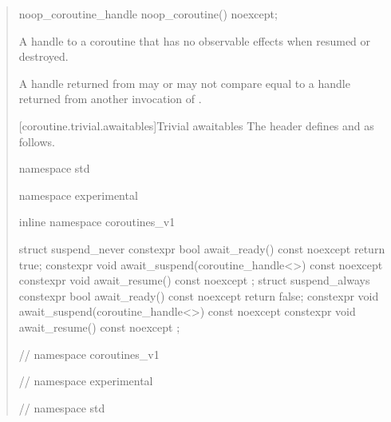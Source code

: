 \begin{quote}
\begin{itemdecl}
  noop_coroutine_handle noop_coroutine() noexcept;
\end{itemdecl}

\begin{itemdescr}
  \pnum\returns A handle to a coroutine that has no observable effects when resumed or destroyed.
  
  \pnum\remarks A handle returned from  may or may not compare equal to a handle returned from another invocation of .
\end{itemdescr}

[coroutine.trivial.awaitables]{Trivial awaitables}
The header  defines  and  as follows.
\begin{codeblock}
namespace std {
namespace experimental {
inline namespace coroutines_v1 {

  struct suspend_never {
    constexpr bool await_ready() const noexcept { return true; }
    constexpr void await_suspend(coroutine_handle<>) const noexcept {}
    constexpr void await_resume() const noexcept {}
  };
  struct suspend_always {
    constexpr bool await_ready() const noexcept { return false; }
    constexpr void await_suspend(coroutine_handle<>) const noexcept {}
    constexpr void await_resume() const noexcept {}
  };

} // namespace coroutines_v1
} // namespace experimental
} // namespace std
\end{codeblock}
\end{quote}

